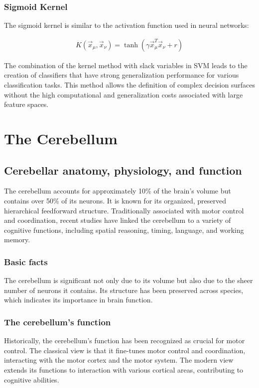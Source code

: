 \documentclass[11pt]{book} %
\begin{document}
\subsubsection{Sigmoid Kernel}
The sigmoid kernel is similar to the activation function used in neural networks:

\begin{align*}
    K(\vec{x}_\mu, \vec{x}_\nu) = \tanh(\gamma \vec{x}_\mu^T \vec{x}_\nu + r)
\end{align*}

The combination of the kernel method with slack variables in SVM leads to the creation of classifiers 
that have strong generalization performance for various classification tasks. 
This method allows the definition of complex decision surfaces without the high computational and generalization costs associated with large feature spaces.


\section{The Cerebellum}

\subsection{Cerebellar anatomy, physiology, and function}
The cerebellum accounts for approximately 10\% of the brain's volume but contains over 50\% of its neurons. It is known for its organized, preserved hierarchical feedforward structure. Traditionally associated with motor control and coordination, recent studies have linked the cerebellum to a variety of cognitive functions, including spatial reasoning, timing, language, and working memory.

\subsubsection{Basic facts}
The cerebellum is significant not only due to its volume but also due to the sheer number of neurons it contains. Its structure has been preserved across species, which indicates its importance in brain function.

\subsubsection{The cerebellum's function}
Historically, the cerebellum's function has been recognized as crucial for motor control. The classical view is that it fine-tunes motor control and coordination, interacting with the motor cortex and the motor system. The modern view extends its functions to interaction with various cortical areas, contributing to cognitive abilities.
\end{document}
